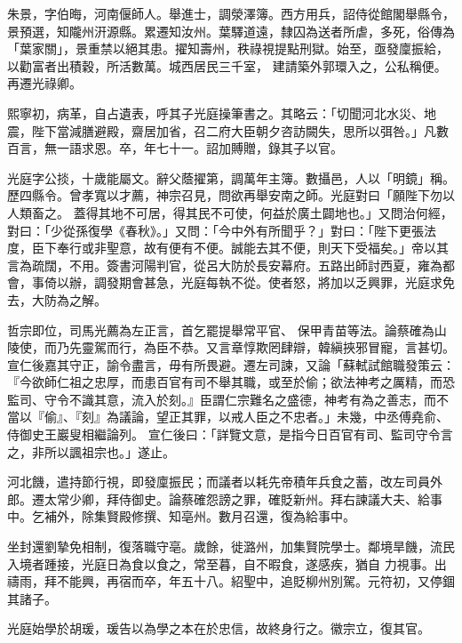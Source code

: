 \begin{pinyinscope}
 朱景，字伯晦，河南偃師人。舉進士，調滎澤簿。西方用兵，詔侍從館閣舉縣令，景預選，知隴州汧源縣。累遷知汝州。葉驛道遠，隸囚為送者所虐，多死，俗傳為「葉家關」，景重禁以絕其患。擢知壽州，秩祿視提點刑獄。始至，亟發廩振給，以勸富者出積穀，所活數萬。城西居民三千室，
 建請築外郭環入之，公私稱便。再遷光祿卿。



 熙寧初，病革，自占遺表，呼其子光庭操筆書之。其略云：「切聞河北水災、地震，陛下當減膳避殿，齋居加省，召二府大臣朝夕咨訪闕失，思所以弭咎。」凡數百言，無一語求恩。卒，年七十一。詔加賻贈，錄其子以官。



 光庭字公掞，十歲能屬文。辭父蔭擢第，調萬年主簿。數攝邑，人以「明鏡」稱。歷四縣令。曾孝寬以才薦，神宗召見，問欲再舉安南之師。光庭對曰「願陛下勿以人類畜之。
 蓋得其地不可居，得其民不可使，何益於廣土闢地也。」又問治何經，對曰：「少從孫復學《春秋》。」又問：「今中外有所聞乎？」對曰：「陛下更張法度，臣下奉行或非聖意，故有便有不便。誠能去其不便，則天下受福矣。」帝以其言為疏闊，不用。簽書河陽判官，從呂大防於長安幕府。五路出師討西夏，雍為都會，事倚以辦，調發期會甚急，光庭每執不從。使者怒，將加以乏興罪，光庭求免去，大防為之解。



 哲宗即位，司馬光薦為左正言，首乞罷提舉常平官、
 保甲青苗等法。論蔡確為山陵使，而乃先靈駕而行，為臣不恭。又言章惇欺罔肆辯，韓縝挾邪冒寵，言甚切。宣仁後嘉其守正，諭令盡言，毋有所畏避。遷左司諫，又論「蘇軾試館職發策云：『今欲師仁祖之忠厚，而患百官有司不舉其職，或至於偷；欲法神考之厲精，而恐監司、守令不識其意，流入於刻。』臣謂仁宗難名之盛德，神考有為之善志，而不當以『偷』、『刻』為議論，望正其罪，以戒人臣之不忠者。」未幾，中丞傅堯俞、侍御史王巖叟相繼論列。
 宣仁後曰：「詳覽文意，是指今日百官有司、監司守令言之，非所以諷祖宗也。」遂止。



 河北饑，遣持節行視，即發廩振民；而議者以耗先帝積年兵食之蓄，改左司員外郎。遷太常少卿，拜侍御史。論蔡確怨謗之罪，確貶新州。拜右諫議大夫、給事中。乞補外，除集賢殿修撰、知亳州。數月召還，復為給事中。



 坐封還劉摯免相制，復落職守亳。歲餘，徙潞州，加集賢院學士。鄰境旱饑，流民入境者踵接，光庭日為食以食之，常至暮，自不暇食，遂感疾，猶自
 力視事。出禱雨，拜不能興，再宿而卒，年五十八。紹聖中，追貶柳州別駕。元符初，又停錮其諸子。



 光庭始學於胡瑗，瑗告以為學之本在於忠信，故終身行之。徽宗立，復其官。




\end{pinyinscope}
